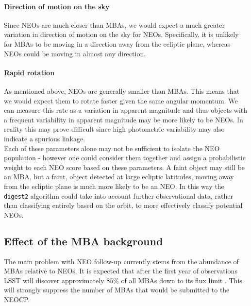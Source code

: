 \documentclass[twocolumn]{aastex631}
\newcommand{\dig}{\texttt{digest2}}
\begin{document}
\paragraph{Direction of motion on the sky} Since NEOs are much closer than MBAs, we would expect a much greater variation in direction of motion on the sky for NEOs. Specifically, it is unlikely for MBAs to be moving in a direction away from the ecliptic plane, whereas NEOs could be moving in almost any direction.

\paragraph{Rapid rotation} As mentioned above, NEOs are generally smaller than MBAs. This means that we would expect them to rotate faster given the same angular momentum. We can measure this rate as a variation in apparent magnitude and thus objects with a frequent variability in apparent magnitude may be more likely to be NEOs. In reality this may prove difficult since high photometric variability may also indicate a spurious linkage.\\

Each of these parameters alone may not be sufficient to isolate the NEO population - however one could consider them together and assign a probabilistic weight to each NEO score based on these parameters. A faint object may still be an MBA, but a faint, object detected at large ecliptic latitudes, moving away from the ecliptic plane is much more likely to be an NEO. In this way the \dig{} algorithm could take into account further observational data, rather than classifying entirely based on the orbit, to more effectively classify potential NEOs.

\subsection{Effect of the MBA background}
The main problem with NEO follow-up currently stems from the abundance of MBAs relative to NEOs. It is expected that after the first year of observations LSST will discover approximately $85\%$ of all MBAs down to its flux limit \citep{Juric+2020}. This will strongly suppress the number of MBAs that would be submitted to the NEOCP.
\end{document}
